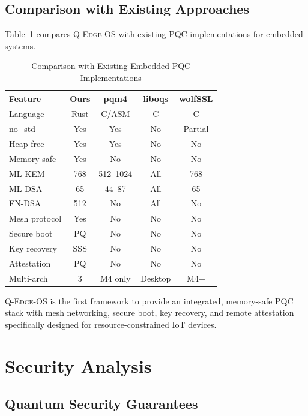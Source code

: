 \documentclass[conference,10pt]{IEEEtran}
\newcommand{\system}{\textsc{Q-Edge-OS}}
\begin{document}
\subsection{Comparison with Existing Approaches}

Table~\ref{tab:comparison} compares \system{} with existing PQC implementations for embedded systems.

\begin{table}[t]
\centering
\caption{Comparison with Existing Embedded PQC Implementations}
\label{tab:comparison}
\begin{tabular}{lcccc}
\toprule
\textbf{Feature} & \textbf{Ours} & \textbf{pqm4} & \textbf{liboqs} & \textbf{wolfSSL} \\
\midrule
Language & Rust & C/ASM & C & C \\
no\_std & Yes & Yes & No & Partial \\
Heap-free & Yes & Yes & No & No \\
Memory safe & Yes & No & No & No \\
ML-KEM & 768 & 512--1024 & All & 768 \\
ML-DSA & 65 & 44--87 & All & 65 \\
FN-DSA & 512 & No & All & No \\
Mesh protocol & Yes & No & No & No \\
Secure boot & PQ & No & No & No \\
Key recovery & SSS & No & No & No \\
Attestation & PQ & No & No & No \\
Multi-arch & 3 & M4 only & Desktop & M4+ \\
\bottomrule
\end{tabular}
\end{table}

\system{} is the first framework to provide an integrated, memory-safe PQC stack with mesh networking, secure boot, key recovery, and remote attestation specifically designed for resource-constrained IoT devices.

\section{Security Analysis}
\label{sec:security}

\subsection{Quantum Security Guarantees}
\end{document}
